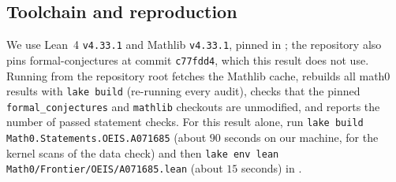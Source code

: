 \documentclass[11pt]{amsart}
\theoremstyle{plain}
\theoremstyle{definition}
\begin{document}
\subsection*{Toolchain and reproduction}
We use Lean~4 \cite{Lean4} \texttt{v4.33.1} and Mathlib \cite{Mathlib} \texttt{v4.33.1}, pinned in ; the repository also pins formal-conjectures \cite{FC} at commit \texttt{c77fdd4}, which this result does not use. Running  from the repository root fetches the Mathlib cache, rebuilds all math0 results with \texttt{lake build} (re-running every audit), checks that the pinned \texttt{formal\_conjectures} and \texttt{mathlib} checkouts are unmodified, and reports the number of passed statement checks. For this result alone, run \texttt{lake build Math0.Statements.OEIS.A071685} (about $90$ seconds on our machine, for the kernel scans of the data check) and then \texttt{lake env lean Math0/Frontier/OEIS/A071685.lean} (about $15$ seconds) in .
\end{document}
